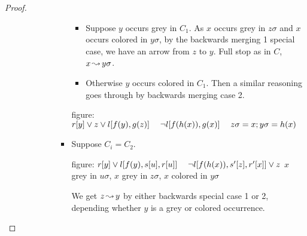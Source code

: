 \documentclass[,%
	paper=a4,%
	DIV11, %
	twoside=false,%
	liststotoc,
	bibtotoc,
	draft=false,%
	numbers=noendperiod
]{scrartcl}
\begin{document}
\begin{proof}
\begin{description}
\begin{itemize}
\begin{itemize}
\begin{itemize}
							\begin{itemize}
								\item
									Suppose $y$ occurs grey in $C_1$.
									As $x$ occurs grey in $z\sigma$ and $x$ occurs colored in $y\sigma$, by the backwards merging 1 special case, we have an arrow from $z$ to $y$. Full stop as in $C$, $x\operatorname{\leadsto} y\sigma$.

								\item
									Otherwise $y$ occurs colored in $C_1$. Then a similar reasoning goes through by backwards merging case 2.
							\end{itemize}

							\mbox{figure: $ r[y] \lor z \lor l[f(y), g(z)]\quad\; \lnot l[f(h(x)), g(x)]\;\quad z\sigma = x;y\sigma=h(x)$}


						\item Suppose $C_i = C_2$.

									figure: $ r[y] \lor l[f(y), s[u], r[u]]\quad\; \lnot l[f(h(x)), s'[z], r'[x]] \lor z $
									\newline
									$x$ grey in $u \sigma$, $x$ grey in $z\sigma$, $x$ colored in $y\sigma$

									We get $z\operatorname{\leadsto} y$ by either backwards special case 1 or 2, depending whether $y$ is a grey or colored occurrence.




\end{itemize}
\end{itemize}
\end{itemize}
\end{description}
\end{proof}
\end{document}
